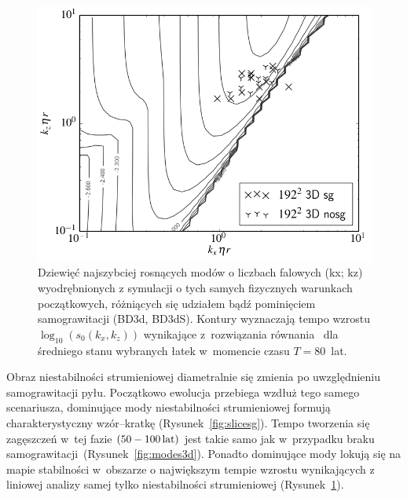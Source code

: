 %
\begin{figure}[h]
   \centering
   \includegraphics[width=0.5\linewidth]{figures/3d_map_x3_50.png}
   \caption{
      Dziewięć najszybciej rosnących modów o liczbach falowych (kx; kz)
      wyodrębnionych z symulacji o tych samych fizycznych warunkach
      początkowych, różniących się udziałem bądź pominięciem
      samograwitacji (BD3d, BD3dS).  Kontury wyznaczają tempo wzrostu
      $\log_{10}(s_0(k_x, k_z))$ wynikające z~rozwiązania równania~
       dla średniego stanu wybranych łatek w~momencie
      czasu $T = 80$~lat.}
   \label{fig:map3d}
\end{figure}
Obraz niestabilności strumieniowej diametralnie się zmienia po
uwzględnieniu samograwitacji pyłu. Początkowo ewolucja przebiega wzdłuż tego
samego scenariusza, dominujące mody niestabilności strumieniowej formują
charakterystyczny wzór--kratkę (Rysunek~\ref{fig:slicesg}). Tempo tworzenia się
zagęszczeń w~tej fazie $(50 - 100\hbox{$\thinspace\textrm{lat}$})$ jest takie samo jak w~przypadku braku
samograwitacji~(Rysunek~\ref{fig:modes3d}). Ponadto dominujące mody lokują się
na mapie stabilności w~obszarze o największym tempie wzrostu wynikających z
liniowej analizy samej tylko niestabilności strumieniowej 
(Rysunek~\ref{fig:map3d}).
%
